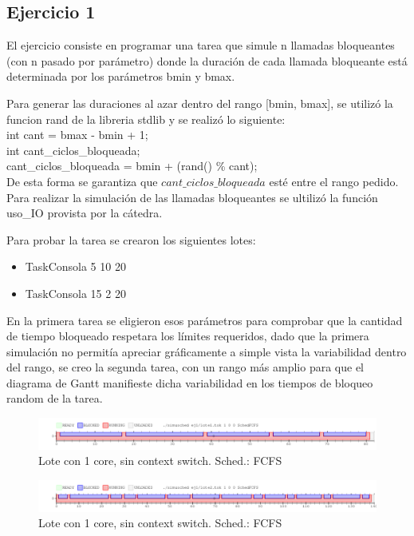 \subsection{Ejercicio 1}
El ejercicio consiste en programar una tarea que simule n llamadas bloqueantes (con n pasado por parámetro) donde la duración de cada llamada bloqueante está determinada por los parámetros bmin y bmax.

Para generar las duraciones al azar dentro del rango [bmin, bmax], se utilizó la funcion rand de la libreria stdlib y se realizó lo siguiente:\\

int cant = bmax - bmin + 1; \\
int cant_ciclos_bloqueada;\\
cant_ciclos_bloqueada = bmin + (rand() \% cant);\\

De esta forma se garantiza que $cant\_ciclos\_bloqueada$ esté entre el rango pedido.
Para realizar la simulación de las llamadas bloqueantes se ultilizó la función uso_IO provista por la cátedra.

Para probar la tarea se crearon los siguientes lotes:

\begin{itemize}
\item TaskConsola 5 10 20 
\item TaskConsola 15 2 20 
\end{itemize}

En la primera tarea se eligieron esos parámetros para comprobar que la cantidad de tiempo bloqueado respetara los límites requeridos, dado que la primera simulación no permitía apreciar gráficamente a simple vista la variabilidad dentro del rango, se creo la segunda tarea, con un rango más amplio para que el diagrama de Gantt manifieste dicha variabilidad en los tiempos de bloqueo random de la tarea.

\begin{figure}[h]
  \includegraphics[width=\textwidth]{../ej1/lote1.png}
  \caption{Lote con 1 core, sin context switch. Sched.: FCFS}
\end{figure}

\begin{figure}[h]
  \includegraphics[width=\textwidth]{../ej1/lote2.png}
  \caption{Lote con 1 core, sin context switch. Sched.: FCFS}
\end{figure}